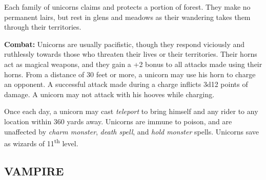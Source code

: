 \begin{multicols}{2}
Each family of unicorns claims and protects a portion of forest. They make no permanent lairs, but rest in glens and meadows as their wandering takes them through their territories.

\textbf{Combat:} Unicorns are usually pacifistic, though they respond viciously and ruthlessly towards those who threaten their lives or their territories. Their horns act as magical weapons, and they gain a +2 bonus to all attacks made using their horns. From a distance of 30 feet or more, a unicorn may use his horn to charge an opponent. A successful attack made during a charge inflicts 3d12 points of damage. A unicorn may not attack with his hooves while charging.

Once each day, a unicorn may cast \textit{teleport} to bring himself and any rider to any location within 360 yards away. Unicorns are immune to poison, and are unaffected by \textit{charm monster}, \textit{death spell}, and \textit{hold monster} spells. Unicorns save as wizards of 11\textsuperscript{th} level.

\noindent
\begin{minipage}{\columnwidth}

\vspace{1em}

\subsection{VAMPIRE}


\end{minipage}
\end{multicols}
